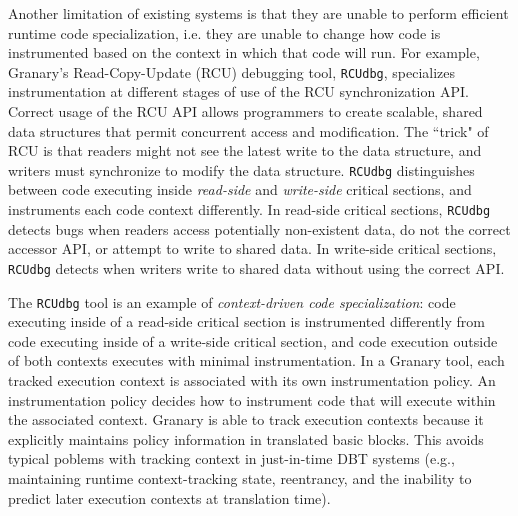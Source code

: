 \documentclass[preprint]{sigplanconf}
\begin{document}

Another limitation of existing systems is that they are unable to perform efficient runtime code specialization, i.e. they are unable to change how code is instrumented based on the context in which that code will run. For example, Granary's Read-Copy-Update (RCU) debugging tool, \texttt{RCUdbg}, specializes instrumentation at different stages of use of the RCU synchronization API. Correct usage of the RCU API allows programmers to create scalable, shared data structures that permit concurrent access and modification. The ``trick" of RCU is that readers might not see the latest write to the data structure, and writers must synchronize to modify the data structure. \texttt{RCUdbg} distinguishes between code executing inside \emph{read-side} and \emph{write-side} critical sections, and instruments each code context differently. In read-side critical sections, \texttt{RCUdbg} detects bugs when readers access potentially non-existent data, do not the correct accessor API, or attempt to write to shared data. In write-side critical sections, \texttt{RCUdbg} detects when writers write to shared data without using the correct API. 




The \texttt{RCUdbg} tool is an example of \emph{context-driven code specialization}: code executing inside of a read-side critical section is instrumented differently from code executing inside of a write-side critical section, and code execution outside of both contexts executes with minimal instrumentation. In a Granary tool, each tracked execution context is associated with its own instrumentation policy. An instrumentation policy decides how to instrument code that will execute within the associated context. Granary is able to track execution contexts because it explicitly maintains policy information in translated basic blocks. This avoids typical poblems with tracking context in just-in-time DBT systems (e.g., maintaining runtime context-tracking state, reentrancy, and the inability to predict later execution contexts at translation time).
\end{document}
